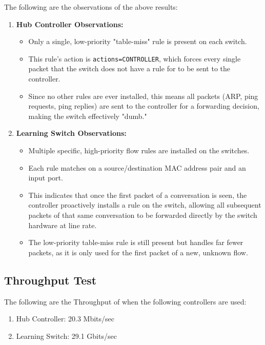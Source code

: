 \documentclass[12pt]{article}
\begin{document}
The following are the observations of the above results:

\begin{enumerate}
    \item \textbf{Hub Controller Observations:}
        \begin{itemize}
            \item Only a single, low-priority "table-miss" rule is present on each switch.
            \item This rule's action is \texttt{actions=CONTROLLER}, which forces every single packet that the switch does not have a rule for to be sent to the controller.
            \item Since no other rules are ever installed, this means all packets (ARP, ping requests, ping replies) are sent to the controller for a forwarding decision, making the switch effectively "dumb."
        \end{itemize}
    \item \textbf{Learning Switch Observations:}
        \begin{itemize}
            \item Multiple specific, high-priority flow rules are installed on the switches.
            \item Each rule matches on a source/destination MAC address pair and an input port.
            \item This indicates that once the first packet of a conversation is seen, the controller proactively installs a rule on the switch, allowing all subsequent packets of that same conversation to be forwarded directly by the switch hardware at line rate.
            \item The low-priority table-miss rule is still present but handles far fewer packets, as it is only used for the first packet of a new, unknown flow.
        \end{itemize}
\end{enumerate}


\subsection{Throughput Test}

The following are the Throughput of when the following controllers are used:
\begin{enumerate}
    \item Hub Controller: 20.3 Mbits/sec
    \item Learning Switch: 29.1 Gbits/sec
\end{enumerate}
\end{document}
